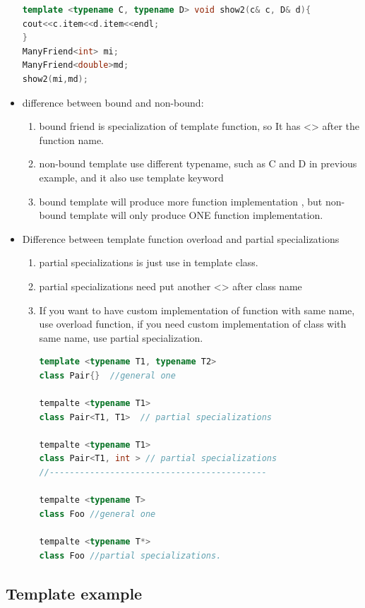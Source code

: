 \documentclass[a4paper,12pt,twoside]{book}
\begin{document}
\begin{itemize}
\begin{lstlisting}[frame=single, language=c++]
template <typename C, typename D> void show2(c& c, D& d){
cout<<c.item<<d.item<<endl;
}
ManyFriend<int> mi;
ManyFriend<double>md;
show2(mi,md);
\end{lstlisting}

\item difference between bound and non-bound:
\begin{enumerate}
\item bound friend is specialization of template function, so It has <> after the function name.
\item non-bound template use different typename, such as C and D in previous example, and it also use template keyword
\item bound template will produce more function implementation , but non-bound template will only produce ONE function implementation.
\end{enumerate}

\item Difference between template function overload and partial specializations
\begin{enumerate}
\item partial specializations is just use in template class.
\item partial specializations need put another <> after class name
\item If you want to have custom implementation of function with same name, use overload function, if you need  custom implementation of class with same name, use partial specialization.
\begin{lstlisting}[frame=single, language=c++]
template <typename T1, typename T2>
class Pair{}  //general one

tempalte <typename T1>
class Pair<T1, T1>  // partial specializations

tempalte <typename T1>
class Pair<T1, int > // partial specializations
//-------------------------------------------

tempalte <typename T>
class Foo //general one

tempalte <typename T*>
class Foo //partial specializations.
\end{lstlisting}

\end{enumerate}

\end{itemize}

\subsection{Template example}
\end{document}
